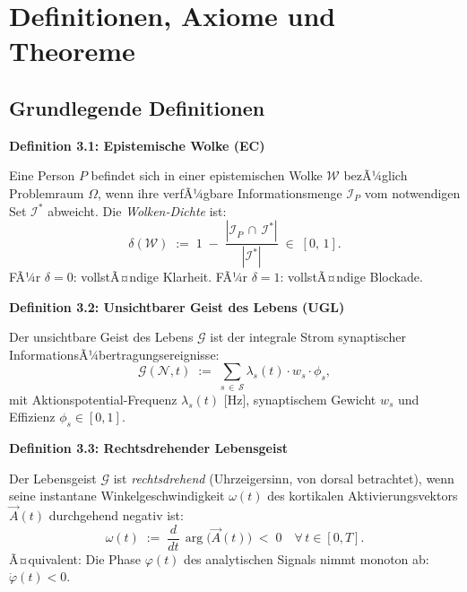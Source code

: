 ﻿\documentclass[12pt,a4paper]{report}
\theoremstyle{plain}
\theoremstyle{definition}
\theoremstyle{remark}
\begin{document}
	\chapter{Definitionen, Axiome und Theoreme}
	
	\section{Grundlegende Definitionen}
	
	
	\noindent\textbf{Definition 3.1: Epistemische Wolke (EC)}

		Eine Person $P$ befindet sich in einer epistemischen Wolke
		$\mathcal{W}$ bezÃ¼glich Problemraum $\Omega$, wenn ihre verfÃ¼gbare
		Informationsmenge $\mathcal{I}_P$ vom notwendigen Set $\mathcal{I}^*$
		abweicht. Die \emph{Wolken-Dichte} ist:
		\[
		\delta(\mathcal{W}) \;:=\; 1 \;-\;
		\frac{|\mathcal{I}_P \,\cap\, \mathcal{I}^*|}{|\mathcal{I}^*|}
		\;\in\; [0,\,1].
		\]
		FÃ¼r $\delta = 0$: vollstÃ¤ndige Klarheit. FÃ¼r $\delta = 1$: vollstÃ¤ndige Blockade.

	
	
	\noindent\textbf{Definition 3.2: Unsichtbarer Geist des Lebens (UGL)}

		Der unsichtbare Geist des Lebens $\mathcal{G}$ ist der integrale
		Strom synaptischer InformationsÃ¼bertragungsereignisse:
		\[
		\mathcal{G}(\mathcal{N}, t)
		\;:=\; \sum_{s \,\in\, \mathcal{S}}
		\lambda_s(t)\cdot w_s \cdot \phi_s,
		\]
		mit Aktionspotential-Frequenz $\lambda_s(t)$ [Hz], synaptischem Gewicht
		$w_s$ und Effizienz $\phi_s \in [0,1]$.

	
	
	\noindent\textbf{Definition 3.3: Rechtsdrehender Lebensgeist}

		\label{def:rechtsdrehend}
		Der Lebensgeist $\mathcal{G}$ ist \emph{rechtsdrehend} (Uhrzeigersinn,
		von dorsal betrachtet), wenn seine instantane Winkelgeschwindigkeit
		$\omega(t)$ des kortikalen Aktivierungsvektors $\vec{A}(t)$ durchgehend
		negativ ist:
		\[
		\omega(t) \;:=\; \frac{d}{dt}\,\arg\bigl(\vec{A}(t)\bigr)
		\;<\; 0 \quad \forall\, t \in [0, T].
		\]
		Ã¤quivalent: Die Phase $\varphi(t)$ des analytischen Signals nimmt
		monoton ab: $\dot{\varphi}(t) < 0$.
\end{document}
